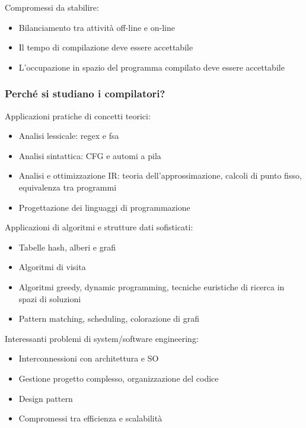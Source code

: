 \documentclass[11pt]{article}
\begin{document}
        Compromessi da stabilire:
        \begin{itemize}
            \item Bilanciamento tra attività off-line e on-line
            \item Il tempo di compilazione deve essere accettabile
            \item L'occupazione in spazio del programma compilato deve essere accettabile
        \end{itemize}
        
    \subsubsection{Perché si studiano i compilatori?}
        Applicazioni pratiche di concetti teorici:
        \begin{itemize}
            \item Analisi lessicale: regex e fsa
            \item Analisi sintattica: CFG e automi a pila
            \item Analisi e ottimizzazione IR: teoria dell'approssimazione, calcoli di punto fisso, equivalenza tra programmi
            \item Progettazione dei linguaggi di programmazione
        \end{itemize}

        Applicazioni di algoritmi e strutture dati sofisticati:
        \begin{itemize}
            \item Tabelle hash, alberi e grafi
            \item Algoritmi di visita
            \item Algoritmi greedy, dynamic programming, tecniche euristiche di ricerca in spazi di soluzioni
            \item Pattern matching, scheduling, colorazione di grafi
        \end{itemize}

        Interessanti problemi di system/software engineering:
        \begin{itemize}
            \item Interconnessioni con architettura e SO
            \item Gestione progetto complesso, organizzazione del codice
            \item Design pattern
            \item Compromessi tra efficienza e scalabilità
        \end{itemize}
\end{document}

